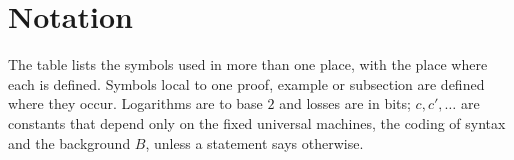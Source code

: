 \section{Notation}\label{app:notation}

The table lists the symbols used in more than one place, with the place where each is defined. Symbols local to one proof, example or subsection are defined where they occur. Logarithms are to base $2$ and losses are in bits; $c,c',\dots$ are constants that depend only on the fixed universal machines, the coding of syntax and the background $B$, unless a statement says otherwise.

